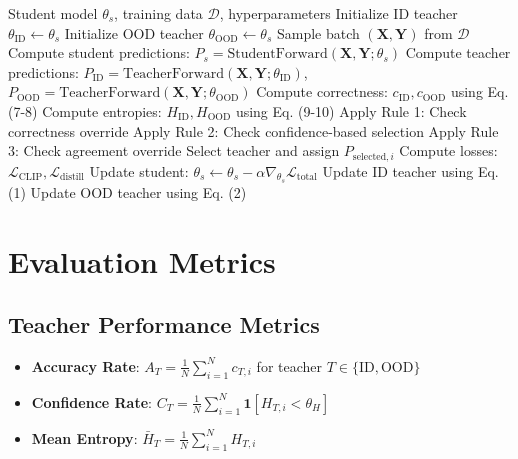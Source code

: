 \documentclass[11pt,a4paper]{article}
\begin{document}
\begin{algorithm}
\caption{Correctness-Aware Dual-Teacher Distillation}
\begin{algorithmic}[1]
\REQUIRE Student model $\theta_s$, training data $\mathcal{D}$, hyperparameters
\STATE Initialize ID teacher $\theta_{\text{ID}} \leftarrow \theta_s$
\STATE Initialize OOD teacher $\theta_{\text{OOD}} \leftarrow \theta_s$
    \STATE Sample batch $(\mathbf{X}, \mathbf{Y})$ from $\mathcal{D}$
    \STATE Compute student predictions: $P_s = \text{StudentForward}(\mathbf{X}, \mathbf{Y}; \theta_s)$
    \STATE Compute teacher predictions: $P_{\text{ID}} = \text{TeacherForward}(\mathbf{X}, \mathbf{Y}; \theta_{\text{ID}})$, $P_{\text{OOD}} = \text{TeacherForward}(\mathbf{X}, \mathbf{Y}; \theta_{\text{OOD}})$
    \STATE Compute correctness: $c_{\text{ID}}, c_{\text{OOD}}$ using Eq. (7-8)
    \STATE Compute entropies: $H_{\text{ID}}, H_{\text{OOD}}$ using Eq. (9-10)
        \STATE Apply Rule 1: Check correctness override
        \STATE Apply Rule 2: Check confidence-based selection
        \STATE Apply Rule 3: Check agreement override
        \STATE Select teacher and assign $P_{\text{selected}, i}$
    \ENDFOR
    \STATE Compute losses: $\mathcal{L}_{\text{CLIP}}, \mathcal{L}_{\text{distill}}$
    \STATE Update student: $\theta_s \leftarrow \theta_s - \alpha \nabla_{\theta_s} \mathcal{L}_{\text{total}}$
        \STATE Update ID teacher using Eq. (1)
    \ENDIF
        \STATE Update OOD teacher using Eq. (2)
    \ENDIF
\ENDFOR
\end{algorithmic}
\end{algorithm}

\section{Evaluation Metrics}

\subsection{Teacher Performance Metrics}

\begin{itemize}
\item \textbf{Accuracy Rate}: $A_T = \frac{1}{N} \sum_{i=1}^{N} c_{T,i}$ for teacher $T \in \{\text{ID}, \text{OOD}\}$
\item \textbf{Confidence Rate}: $C_T = \frac{1}{N} \sum_{i=1}^{N} \mathbf{1}[H_{T,i} < \theta_H]$
\item \textbf{Mean Entropy}: $\bar{H}_T = \frac{1}{N} \sum_{i=1}^{N} H_{T,i}$
\end{itemize}
\end{document}

